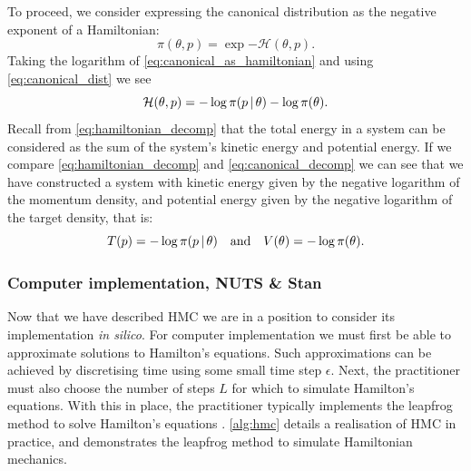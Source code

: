To proceed, we consider expressing the canonical distribution as the
negative exponent of a Hamiltonian:
\begin{equation}
  \label{eq:canonical_as_hamiltonian}
  \pi(\theta, p) = \exp{-\mathcal{H}(\theta, p)}.
\end{equation}
Taking the logarithm of \cref{eq:canonical_as_hamiltonian} and using \cref{eq:canonical_dist}
we see
\begin{equation}
  \label{eq:canonical_decomp}
  \mathcal{H}(\theta, p) = -\log{\pi(p \,|\,\theta)} - \log{\pi(\theta)}.
\end{equation}
Recall from \cref{eq:hamiltonian_decomp} that the total energy in a system can be
considered as the sum of the system's kinetic energy and potential energy.  If we compare
\cref{eq:hamiltonian_decomp} and \cref{eq:canonical_decomp} we can see that we have
constructed a system with kinetic energy given by the negative logarithm of the momentum
density, and potential energy given by the negative logarithm of the target density, that
is:
\begin{equation*}
    T(p) = -\log{\pi(p \,|\,\theta)} \quad\text{and}\quad V(\theta) = -\log{\pi(\theta)}.
\end{equation*}

\subsubsection{Computer implementation, NUTS \& Stan}

Now that we have described HMC we are in a position to consider its implementation
\emph{in silico}. For computer implementation we must first be able to approximate
solutions to Hamilton's equations. Such approximations can be achieved by discretising
time using some small time step $\epsilon$. Next, the practitioner must also choose the
number of steps $L$ for which to simulate Hamilton's equations. With this in place, the
practitioner typically implements the leapfrog method to solve Hamilton's equations
\parencite{neal11}. \cref{alg:hmc} details a realisation of HMC in practice, and
demonstrates the leapfrog method to simulate Hamiltonian mechanics.

